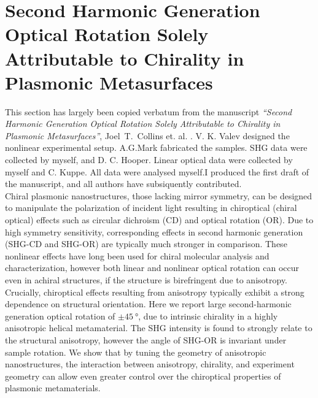 \section{Second Harmonic Generation Optical Rotation Solely Attributable to Chirality in Plasmonic Metasurfaces}\label{sec:results:OAinPlanarNanohelices}
This section has largely been copied verbatum from the manuscript \textit{``Second Harmonic Generation Optical Rotation Solely Attributable to Chirality in Plasmonic Metasurfaces''}, Joel~T.~Collins et. al. \cite{Collins2018b}. 
V. K. Valev designed the nonlinear experimental setup. A.G.Mark fabricated the samples. SHG data were collected by myself, and D. C. Hooper. Linear optical data were collected by myself and C. Kuppe. All data were analysed myself.I produced the first draft of the manuscript, and all authors have subsiquently contributed.
\\

Chiral plasmonic nanostructures, those lacking mirror symmetry, can be designed to manipulate the polarization of incident light resulting in chiroptical (chiral optical) effects such as circular dichroism (CD) and optical rotation (OR). Due to high symmetry sensitivity, corresponding effects in second harmonic generation (SHG-CD and SHG-OR) are typically much stronger in comparison. These nonlinear effects have long been used for chiral molecular analysis and characterization, however both linear and nonlinear optical rotation can occur even in achiral structures, if the structure is birefringent due to anisotropy. Crucially, chiroptical effects resulting from anisotropy typically exhibit a strong dependence on structural orientation. Here we report large second-harmonic generation optical rotation of $\pm\SI{45}{\degree}$, due to intrinsic chirality in a highly anisotropic helical metamaterial. The SHG intensity is found to strongly relate to the structural anisotropy, however the angle of SHG-OR is invariant under sample rotation. We show that by tuning the geometry of anisotropic nanostructures, the interaction between anisotropy, chirality, and experiment geometry can allow even greater control over the chiroptical properties of plasmonic metamaterials.

